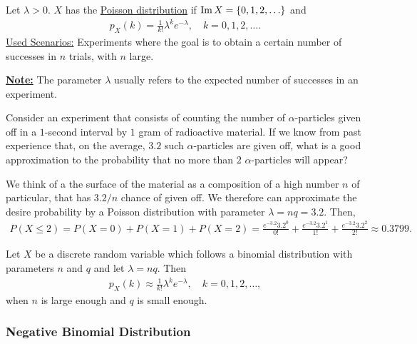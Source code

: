 Let $\lambda > 0$. $X$ has the \underline{Poisson distribution} if $\operatorname{Im} X = \{ 0 , 1, 2, \ldots \}$ and
    \begin{align*}
    p_X (k) = \frac{1}{k!} \lambda^k e^{-\lambda} , \quad k = 0, 1, 2, \ldots .
    \end{align*}
\underline{Used Scenarios:} Experiments where the goal is to obtain a certain number of successes in $n$ trials, with $n$ large.

\underline{\textbf{Note:}} The parameter $\lambda$ usually refers to the expected number of successes in an experiment.%

\begin{example}
Consider an experiment that consists of counting the number of $\alpha$-particles given off in a $1$-second interval by $1$ gram of radioactive material. If we know from past experience that, on the average, $3.2$ such $\alpha$-particles are given off, what is a good approximation to the probability that no more than $2$ $\alpha$-particles will appear?
\end{example}

\begin{sol*}
We think of a the surface of the material as a composition of a high number $n$ of particular, that has $3.2/n$ chance of given off. We therefore can approximate the desire probability by a Poisson distribution with parameter $\lambda = n q = 3.2$. Then,
    \begin{align*}
    P (X \leq 2) = P (X = 0) + P (X = 1) + P (X = 2) = \frac{e^{-3.2} 3.2^0}{0!} + \frac{e^{-3.2} 3.2^1}{1!} + \frac{e^{-3.2} 3.2^2}{2!} \approx 0.3799 . \tag*{$\triangle$}
    \end{align*} 
\end{sol*}

\begin{theorem}
Let $X$ be a discrete random variable which follows a binomial distribution with parameters $n$ and $q$ and let $\lambda = nq$. Then
    \begin{align*}
    p_X (k) \approx \frac{1}{k!} \lambda^k e^{-\lambda} , \quad k = 0 , 1, 2, \ldots ,
    \end{align*}
when $n$ is large enough and $q$ is small enough.
\end{theorem}

\subsubsection*{Negative Binomial Distribution}


